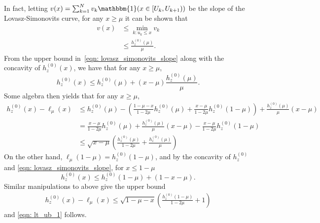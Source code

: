 \documentclass[11pt,twoside]{article}
\newcommand{\1}{\mathbbm{1}}
\begin{document}
In fact, letting $v(x) = \sum_{k = 1}^{N} v_k \1(x \in [U_k, U_{k+1}) )$ be the slope of the Lovasz-Simonovits curve, for any $x \geq \mu$ it can be shown that
\begin{align}
v(x) & \leq \min_{k: u_k \leq x} v_k \nonumber  \\
& \leq \frac{h_z^{(0)}(\mu)}{\mu}. \label{eqn: lovasz_simonovits_slope}
\end{align}
From the upper bound in~\eqref{eqn: lovasz_simonovits_slope} along with the concavity of $h_z^{(0)}(x)$, we have that for any $x \geq \mu$,
\begin{equation*}
h_z^{(0)}(x) \leq h_z^{(0)}(\mu) + (x - \mu)\frac{h_z^{(0)}(\mu)}{\mu}.
\end{equation*}
Some algebra then yields that for any $x \geq \mu$,
\begin{align*}
h_z^{(0)}(x) - \ell_{\mu}(x) & \leq h_z^{(0)}(\mu) - \left(\frac{1 - \mu - x}{1 - 2\mu} h_z^{(0)}(\mu) + \frac{x - \mu}{1 - 2\mu} h_z^{(0)}(1 - \mu)\right) + \frac{h_z^{(0)}(\mu)}{\mu}(x - \mu) \\
& =  \frac{x - \mu}{1 - 2\mu}h_z^{(0)}(\mu) + \frac{h_z^{(0)}(\mu)}{\mu} (x - \mu) - \frac{x - \mu}{1 - 2\mu} h_z^{(0)}(1 - \mu) \\
& \leq \sqrt{x - \mu} \left(\frac{h_z^{(0)}(\mu)}{1 - 2\mu} + \frac{h_z^{(0)}(\mu)}{\mu} \right)
\end{align*}
On the other hand, $\ell_{\mu}(1 - \mu) = h_z^{(0)}(1 - \mu)$, and by the concavity of $h_z^{(0)}$ and \eqref{eqn: lovasz_simonovits_slope},  for $x \leq 1 - \mu$
\begin{equation*}
h_z^{(0)}(x) \leq h_z^{(0)}(1 - \mu) + (1 - x - \mu).
\end{equation*}
Similar manipulations to above give the upper bound
\begin{align*}
h_z^{(0)}(x) - \ell_{\mu}(x) \leq \sqrt{1 - \mu - x}\left(\frac{h_z^{(0)}(1 - \mu) }{1 - 2\mu} + 1\right)
\end{align*}
and \eqref{eqn: lt_ub_1} follows.
\end{document}
